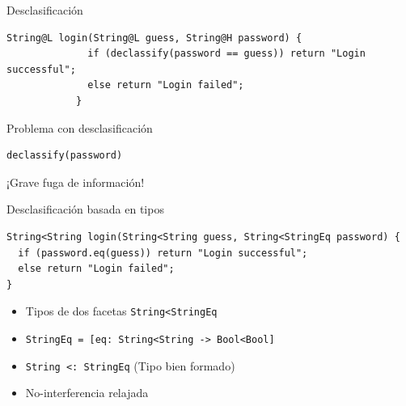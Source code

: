 \documentclass[aspectratio=169,10pt]{beamer}
\begin{document}
\begin{frame}[fragile]{Desclasificación}
	\begin{center}
\begin{lstlisting}[basicstyle=\fontsize{9}{9}\ttfamily]
            String@L login(String@L guess, String@H password) {
              if (declassify(password == guess)) return "Login successful";
              else return "Login failed";
            }
\end{lstlisting}
	\end{center}
\end{frame}

\begin{frame}[fragile]{Problema con desclasificación}
	\begin{center}
\begin{lstlisting}[basicstyle=\fontsize{9}{9}\ttfamily]
                                    declassify(password)
\end{lstlisting} \pause
		\vspace{3cm}
		\alert{¡Grave fuga de información!}
	\end{center}
\end{frame}

\begin{frame}[fragile]{Desclasificación basada en tipos}
\begin{lstlisting}[basicstyle=\fontsize{9}{9}\ttfamily]
String<String login(String<String guess, String<StringEq password) {
  if (password.eq(guess)) return "Login successful";
  else return "Login failed";
}
\end{lstlisting} \pause

\begin{itemize}
	\item Tipos de dos facetas \texttt{String<StringEq} \pause
	\item \texttt{StringEq = [eq: String<String -> Bool<Bool]} \pause
	\item \texttt{String <: StringEq} (Tipo bien formado) \pause
	\item No-interferencia relajada
\end{itemize}

\end{frame}
\end{document}
